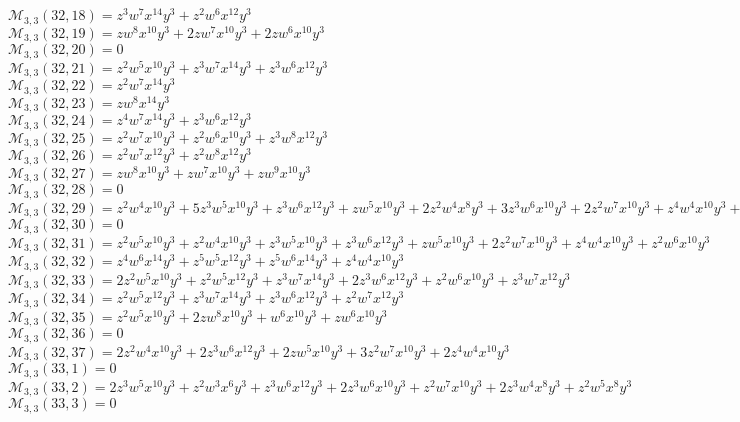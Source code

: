 $\mathcal{M}_{3,3}(32,18)=z^3w^7x^{14}y^3+z^2w^6x^{12}y^3$\\
$\mathcal{M}_{3,3}(32,19)=zw^8x^{10}y^3+2zw^7x^{10}y^3+2zw^6x^{10}y^3$\\
$\mathcal{M}_{3,3}(32,20)=0$\\
$\mathcal{M}_{3,3}(32,21)=z^2w^5x^{10}y^3+z^3w^7x^{14}y^3+z^3w^6x^{12}y^3$\\
$\mathcal{M}_{3,3}(32,22)=z^2w^7x^{14}y^3$\\
$\mathcal{M}_{3,3}(32,23)=zw^8x^{14}y^3$\\
$\mathcal{M}_{3,3}(32,24)=z^4w^7x^{14}y^3+z^3w^6x^{12}y^3$\\
$\mathcal{M}_{3,3}(32,25)=z^2w^7x^{10}y^3+z^2w^6x^{10}y^3+z^3w^8x^{12}y^3$\\
$\mathcal{M}_{3,3}(32,26)=z^2w^7x^{12}y^3+z^2w^8x^{12}y^3$\\
$\mathcal{M}_{3,3}(32,27)=zw^8x^{10}y^3+zw^7x^{10}y^3+zw^9x^{10}y^3$\\
$\mathcal{M}_{3,3}(32,28)=0$\\
$\mathcal{M}_{3,3}(32,29)=z^2w^4x^{10}y^3+5z^3w^5x^{10}y^3+z^3w^6x^{12}y^3+zw^5x^{10}y^3+2z^2w^4x^8y^3+3z^3w^6x^{10}y^3+2z^2w^7x^{10}y^3+z^4w^4x^{10}y^3+z^2w^5x^8y^3$\\
$\mathcal{M}_{3,3}(32,30)=0$\\
$\mathcal{M}_{3,3}(32,31)=z^2w^5x^{10}y^3+z^2w^4x^{10}y^3+z^3w^5x^{10}y^3+z^3w^6x^{12}y^3+zw^5x^{10}y^3+2z^2w^7x^{10}y^3+z^4w^4x^{10}y^3+z^2w^6x^{10}y^3$\\
$\mathcal{M}_{3,3}(32,32)=z^4w^6x^{14}y^3+z^5w^5x^{12}y^3+z^5w^6x^{14}y^3+z^4w^4x^{10}y^3$\\
$\mathcal{M}_{3,3}(32,33)=2z^2w^5x^{10}y^3+z^2w^5x^{12}y^3+z^3w^7x^{14}y^3+2z^3w^6x^{12}y^3+z^2w^6x^{10}y^3+z^3w^7x^{12}y^3$\\
$\mathcal{M}_{3,3}(32,34)=z^2w^5x^{12}y^3+z^3w^7x^{14}y^3+z^3w^6x^{12}y^3+z^2w^7x^{12}y^3$\\
$\mathcal{M}_{3,3}(32,35)=z^2w^5x^{10}y^3+2zw^8x^{10}y^3+w^6x^{10}y^3+zw^6x^{10}y^3$\\
$\mathcal{M}_{3,3}(32,36)=0$\\
$\mathcal{M}_{3,3}(32,37)=2z^2w^4x^{10}y^3+2z^3w^6x^{12}y^3+2zw^5x^{10}y^3+3z^2w^7x^{10}y^3+2z^4w^4x^{10}y^3$\\
$\mathcal{M}_{3,3}(33,1)=0$\\
$\mathcal{M}_{3,3}(33,2)=2z^3w^5x^{10}y^3+z^2w^3x^6y^3+z^3w^6x^{12}y^3+2z^3w^6x^{10}y^3+z^2w^7x^{10}y^3+2z^3w^4x^8y^3+z^2w^5x^8y^3$\\
$\mathcal{M}_{3,3}(33,3)=0$\\
